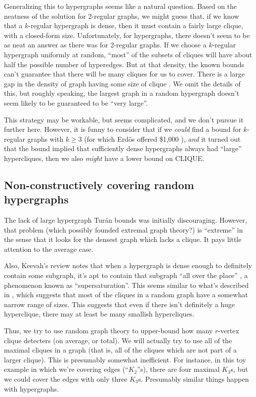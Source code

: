 \documentclass[12pt]{article}
\theoremstyle{definition}
\begin{document}
Generalizing this to hypergraphs seems like a natural question.
Based on the neatness of the solution for 2-regular graphs,
we might guess that, if we know that a $k$-regular hypergraph is dense,
then it must contain a fairly large clique, with a closed-form size.
Unfortunately, for hypergraphs, there doesn't seem to be as neat
an answer as there was for 2-regular graphs. 
If we choose a $k$-regular hypergraph uniformly at random,
``most'' of the subsets of cliques will have about half the
possible number of hyperedges. But at that density,
the known
bounds can't guarantee that there will be many cliques for us to cover.
There is a large gap in the density of graph having some size
of clique
\cite{keevash2011hypergraph}. We omit the details of this, but
roughly speaking,
the largest graph in a random hypergraph doesn't seem likely to be
guaranteed to be ``very large''.

This strategy may be workable, but seems complicated, and we don't pursue
it further here.
However, it is funny to consider that if we {\em could} find a
bound for $k$-regular graphs with $k \ge 3$
(for which Erd\"os offered \$1,000 \cite{keevash2011hypergraph}),
{\em and} it turned
out that the bound implied that sufficiently dense hypergraphs always had
``large'' hypercliques, then we also {\em might} have a
lower bound on CLIQUE.

\subsection{Non-constructively covering random hypergraphs}
\label{sec:maximalHypercliques}

The lack of large hypergraph Tur\'an bounds was initially discouraging.
However, that problem (which possibly founded extremal graph theory?) is
``extreme'' in the sense that it looks for the densest graph which lacks
a clique. It pays little attention to the average case.

Also, Keevah's review notes that when a hypergraph is dense enough to
definitely contain some subgraph, it's apt to contain that subgraph
``all over the place'' \cite{keevash2011hypergraph}, a phenomenon
known as ``supersaturation''.  This seems similar to what's
described in \cite{bollobas1976cliques}, which suggests that most of
the cliques in a random graph have a somewhat narrow range of sizes.
This suggests that even if there isn't definitely a huge hyperclique,
there may at least be many smallish hypercliques.

Thus, we try to use random graph theory to upper-bound how many
$r$-vertex clique detecters (on average, or total). We will actually
try to use all of the maximal cliques in a graph (that is, all of the
cliques which are not part of a larger clique). This is presumably
somewhat inefficient.
For instance, in this toy example in which we're covering edges
(``$K_2$''s), there
are four maximal $K_3$s, but we could cover the edges with
only three $K_3$s.
Presumably similar things happen with hypergraphs.
\end{document}
